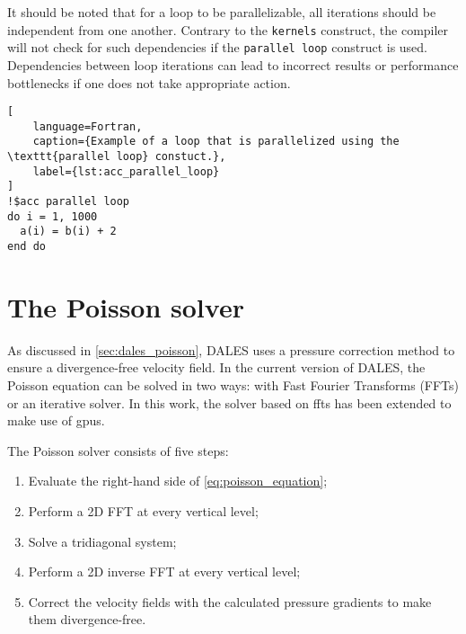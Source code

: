 It should be noted that for a loop to be parallelizable, all iterations should be independent from one another. Contrary to the \texttt{kernels} construct, the compiler will not check for such dependencies if the \texttt{parallel loop} construct is used. Dependencies between loop iterations can lead to incorrect results or performance bottlenecks if one does not take appropriate action. 

\begin{lstlisting}[
    language=Fortran,
    caption={Example of a loop that is parallelized using the \texttt{parallel loop} constuct.},
    label={lst:acc_parallel_loop}
]
!$acc parallel loop
do i = 1, 1000
  a(i) = b(i) + 2
end do
\end{lstlisting}

\section{The Poisson solver}
As discussed in \autoref{sec:dales_poisson}, DALES uses a pressure correction method to ensure a divergence-free velocity field. In the current version of DALES, the Poisson equation can be solved in two ways: with Fast Fourier Transforms (FFTs) or an iterative solver. In this work, the solver based on \acrshort{fft}s has been extended to make use of \acrshort{gpu}s.

The Poisson solver consists of five steps:

\begin{enumerate}
  \item Evaluate the right-hand side of \autoref{eq:poisson_equation};
  \item Perform a 2D FFT at every vertical level;
  \item Solve a tridiagonal system;
  \item Perform a 2D inverse FFT at every vertical level;
  \item Correct the velocity fields with the calculated pressure gradients to make them divergence-free.
\end{enumerate}


